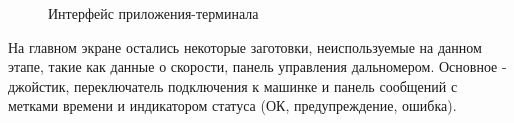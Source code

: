 \documentclass[14pt,a4paper,russian]{scrartcl}
\begin{document}
\begin{figure}[h]
    \centering
    \hfill
    \caption{Интерфейс приложения-терминала}
    \label{fig:android_app}
\end{figure}

На главном экране остались некоторые заготовки, неиспользуемые на данном
этапе, такие как данные о скорости, панель управления дальномером. Основное
- джойстик, переключатель подключения к машинке и панель сообщений
с метками времени и индикатором статуса (ОК, предупреждение, ошибка).
\end{document}
